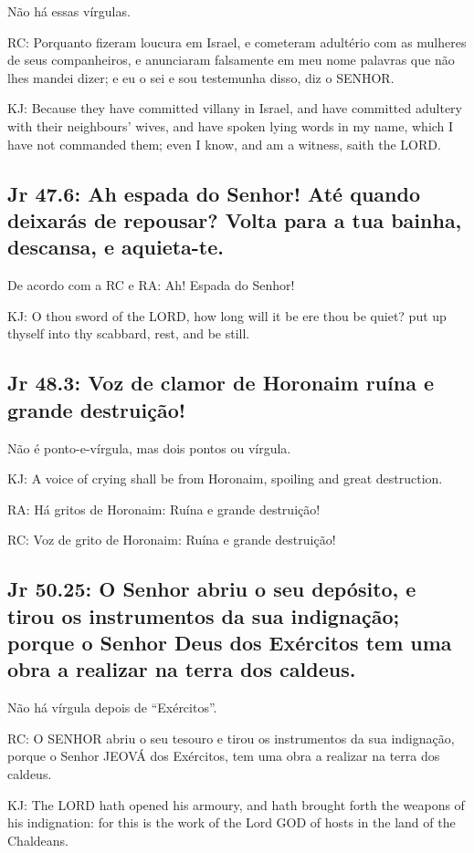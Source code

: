 Não há essas vírgulas.

RC: Porquanto fizeram loucura em Israel, e cometeram adultério com as mulheres de seus companheiros, e anunciaram falsamente em meu nome palavras que não lhes mandei dizer; e eu o sei e sou testemunha disso, diz o SENHOR.

KJ: Because they have committed villany in Israel, and have committed adultery with their neighbours' wives, and have spoken lying words in my name, which I have not commanded them; even I know, and am a witness, saith the LORD.

\subsection{Jr 47.6: Ah\uwave{;} espada do Senhor! Até quando deixarás de repousar? Volta para a tua bainha, descansa, e aquieta-te.}

De acordo com a RC e RA: Ah! Espada do Senhor!

KJ: O thou sword of the LORD, how long will it be ere thou be quiet? put up thyself into thy scabbard, rest, and be still.

\subsection{Jr 48.3: Voz de clamor de Horonaim\uwave{;} ruína e grande destruição!}

Não é ponto-e-vírgula, mas dois pontos ou vírgula.

KJ: A voice of crying shall be from Horonaim, spoiling and great destruction.

RA: Há gritos de Horonaim: Ruína e grande destruição!

RC: Voz de grito de Horonaim: Ruína e grande destruição!

\subsection{Jr 50.25: O Senhor abriu o seu depósito, e tirou os instrumentos da sua indignação; porque o Senhor Deus dos Exércitos\uwave{,} tem uma obra a realizar na terra dos caldeus.}

Não há vírgula depois de ``Exércitos''.

RC: O SENHOR abriu o seu tesouro e tirou os instrumentos da sua indignação, porque o Senhor JEOVÁ dos Exércitos, tem uma obra a realizar na terra dos caldeus.

KJ: The LORD hath opened his armoury, and hath brought forth the weapons of his indignation: for this is the work of the Lord GOD of hosts in the land of the Chaldeans.

